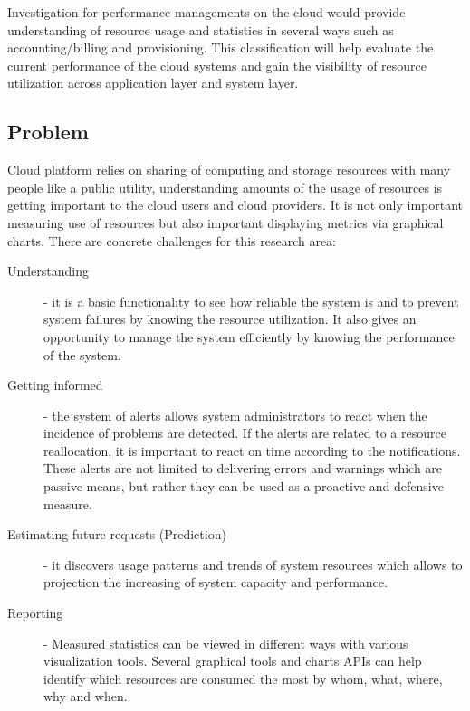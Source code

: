 \documentclass{sig-alternate-05-2015}
\begin{document}
Investigation for performance managements on the cloud would provide understanding of resource usage and statistics in several ways such as accounting/billing and provisioning. This classification will help evaluate the current performance of the cloud systems and gain the visibility of resource utilization across application layer and system layer. 

\subsection{Problem}

Cloud platform relies on sharing of computing and storage resources with many people like a public utility, understanding amounts of the usage of resources is getting important to the cloud users and cloud providers. It is not only important measuring use of resources but also important displaying metrics via graphical charts. There are concrete challenges for this research area: 

\begin{description}

\item[Understanding] - it is a basic functionality to see how reliable the system is and to prevent system failures by knowing the resource utilization. It also gives an opportunity to manage the system efficiently by knowing the performance of the system. 

\item[Getting informed] - the system of alerts allows system administrators to react when the incidence of problems are detected. If the alerts are related to a resource reallocation, it is important to react on time according to the notifications. These alerts are not limited to delivering errors and warnings which are passive means, but rather they can be used as a proactive and defensive measure. 

\item[Estimating future requests (Prediction)] - it discovers usage patterns and trends of system resources which allows to projection the increasing of system capacity and performance. 

\item[Reporting] - Measured statistics can be viewed in different ways with various visualization tools. Several graphical tools and charts APIs can help identify which resources are consumed the most by whom, what, where, why and when. 

\end{description}
\end{document}
